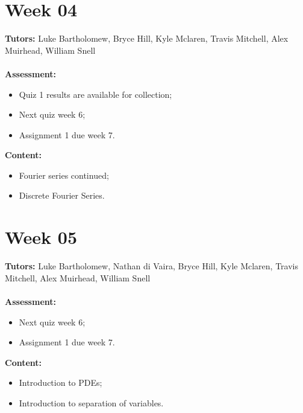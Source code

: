 \documentclass[11pt,a4paper]{report}
\begin{document}
	\begingroup
	\makeatletter
	\let\clearpage\relax
	\vspace*{\fill}%
	\vspace*{\dimexpr-50\p@-\baselineskip}
	\chapter*{Week 04}
	\textbf{Tutors:} Luke Bartholomew, Bryce Hill, Kyle Mclaren, Travis Mitchell, Alex Muirhead, William Snell \\\\
	\textbf{Assessment:} 
	\begin{itemize}
		\item Quiz 1 results are available for collection;
		\item Next quiz week 6;
		\item Assignment 1 due week 7.
	\end{itemize}	
	\textbf{Content:}
	\begin{itemize}
		\item Fourier series continued;
		\item Discrete Fourier Series.
	\end{itemize}
	\vspace*{\fill}
	\endgroup
	
	
	\begingroup
	\makeatletter
	\let\clearpage\relax
	\vspace*{\fill}%
	\vspace*{\dimexpr-50\p@-\baselineskip}
	\chapter*{Week 05}
	\textbf{Tutors:} Luke Bartholomew, Nathan di Vaira, Bryce Hill, Kyle Mclaren, Travis Mitchell, Alex Muirhead, William Snell \\\\
	\textbf{Assessment:} 
	\begin{itemize}
		\item Next quiz week 6;
		\item Assignment 1 due week 7.
	\end{itemize}	
	\textbf{Content:}
	\begin{itemize}
		\item Introduction to PDEs;
		\item Introduction to separation of variables.
	\end{itemize}
	\vspace*{\fill}
	\endgroup
	
	
\end{document}
